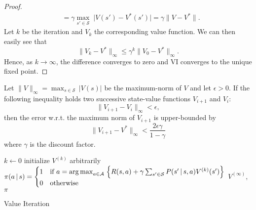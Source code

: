 \begin{proof}
\begin{align}
				 & = \gamma \max_{s' \in \mathcal{S}} \; \bigl\lvert V(s') - V^\ast(s') \bigr\rvert
				= \gamma \bigl\lVert V - V^\ast \bigr\rVert.
			\end{align}
			Let \(k\) be the iteration and \(V_k\) the corresponding value function. We can then easily see that
			\begin{equation}
				\lVert V_k - V^\ast \rVert_\infty \leq \gamma^k \lVert V_0 - V^\ast \rVert_\infty.
			\end{equation}
			Hence, as \(k \to \infty\), the difference converges to zero and \ac{VI} converges to the unique fixed point.
		\end{proof}

		\begin{theorem}
			Let \( \lVert V \rVert_\infty = \max_{s \in \mathcal{S}} \, \lvert V(s) \rvert \) be the maximum-norm of \(V\) and let \(\epsilon > 0\). If the following inequality holds two successive state-value functions \( V_{i + 1} \) and \( V_i \):
			\begin{equation}
				\lVert V_{i + 1} - V_i \rVert_\infty < \epsilon,
			\end{equation}
			then the error w.r.t. the maximum norm of \(V_{i + 1}\) is upper-bounded by
			\begin{equation}
				\lVert V_{i + 1} - V^\ast \rVert_\infty < \frac{2 \epsilon \gamma}{1 - \gamma}
			\end{equation}
			where \(\gamma\) is the discount factor.
		\end{theorem}

		\begin{algorithm}  \DontPrintSemicolon
			\( k \gets 0 \) \;
			initialize \( V^{(k)} \) arbitrarily \;
			\(
			\pi(a \,\vert\, s) =
			\begin{cases}
				1 & \text{if }a = \operatorname*{arg\,max}_{a \in \mathcal{A}} \;\Bigl\{ R(s, a) + \gamma \sum_{s' \in \mathcal{S}} P(s' \,\vert\, s, a) V^{(k)}(s') \Bigr\} \\
				0 & \text{otherwise}
			\end{cases}
			\) \;
			\Return \( V^{(\infty)} \), \( \pi \)
			\caption{Value Iteration}
			\label{alg:vi}
		\end{algorithm}


